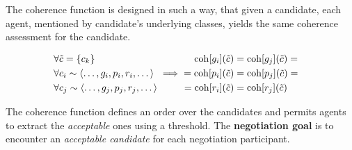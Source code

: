 The coherence function is designed in such a way, that given a candidate,
each agent, mentioned by candidate's underlying classes, yields the same
coherence assessment for the candidate.


\begin{align}
  \label{eq:coh-fun-independ}
  \begin{aligned}
    &\forall \tilde{c} = \{c_k\} \\
    &\forall c_i \sim \left< \dots, g_i, p_i, r_i, \dots \right> \\
    &\forall c_j \sim \left< \dots, g_j, p_j, r_j, \dots \right>
  \end{aligned}
& \implies
  \begin{aligned}
   \mathrm{coh}[g_i](\tilde c) &= \mathrm{coh}[g_j](\tilde c) = \\
   = \mathrm{coh}[p_i](\tilde c) &= \mathrm{coh}[p_j](\tilde c) = \\
   = \mathrm{coh}[r_i](\tilde c) &= \mathrm{coh}[r_j](\tilde c)
  \end{aligned}
\end{align}

\medskip

\noindent
The coherence function defines an order over the candidates and permits
agents to extract the \emph{acceptable} ones using a threshold.
The \textbf{negotiation goal} is to encounter an \emph{acceptable candidate}
for each negotiation participant.






%
